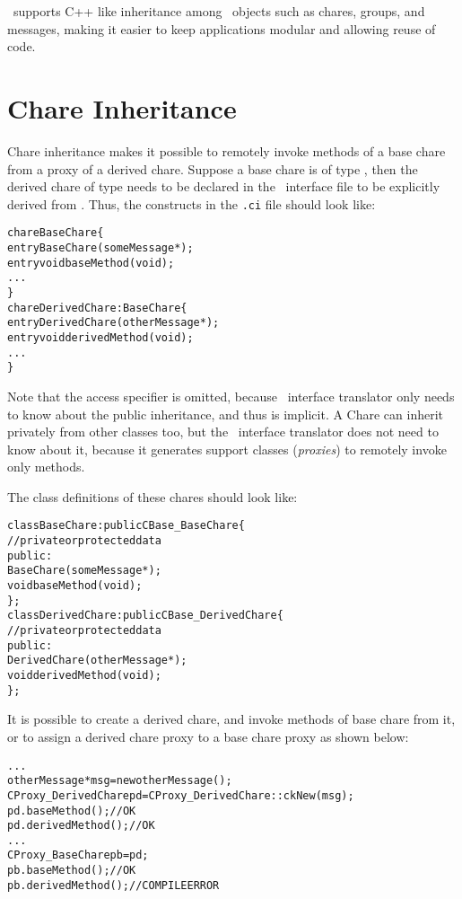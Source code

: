 \charmpp\ supports C++ like inheritance among \charmpp\ objects such as
chares, groups, and messages, making it easier to keep applications
modular and allowing reuse of code.

\section{Chare Inheritance}


Chare inheritance makes it possible to remotely invoke methods of a base
chare  from a proxy of a derived
chare. Suppose a base chare is of type 
, then the derived chare of type  needs to be
declared in the \charmpp\ interface file to be explicitly derived from
. Thus, the constructs in the \texttt{.ci} file should look like:

\begin{alltt}
  chare BaseChare \{
    entry BaseChare(someMessage *);
    entry void baseMethod(void);
    ...
  \}
  chare DerivedChare : BaseChare \{
    entry DerivedChare(otherMessage *);
    entry void derivedMethod(void);
    ...
  \}
\end{alltt}

Note that the access specifier  is omitted, because \charmpp\
interface translator only needs to know about the public inheritance,
and thus \kw{public} is implicit. A Chare can inherit privately from other
classes too, but the \charmpp\ interface translator does not need to know
about it, because it generates support classes ({\em proxies}) to remotely
invoke only \kw{public} methods.

The class definitions of these chares should look like:

\begin{alltt}
  class BaseChare : public CBase\_BaseChare \{
    // private or protected data
    public:
      BaseChare(someMessage *);
      void baseMethod(void);
  \};
  class DerivedChare : public CBase\_DerivedChare \{
    // private or protected data
    public:
      DerivedChare(otherMessage *);
      void derivedMethod(void);
  \};
\end{alltt}

It is possible to create a derived chare, and invoke methods of base
chare from it, or to assign a derived chare proxy to a base chare proxy
as shown below:

\begin{alltt}
  ...
  otherMessage *msg = new otherMessage();
  CProxy_DerivedChare pd = CProxy_DerivedChare::ckNew(msg);
  pd.baseMethod();     // OK
  pd.derivedMethod();  // OK
  ...
  CProxy_BaseChare pb = pd;
  pb.baseMethod();    // OK
  pb.derivedMethod(); // COMPILE ERROR
\end{alltt}

